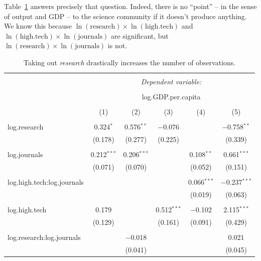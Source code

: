\documentclass[11pt]{article}
\begin{document}
Table~\ref{science_model_regressions} answers precisely that question. Indeed, there is no ``point'' -- in the sense of output and GDP -- to the science community if it doesn't produce anything. We know this because
$\ln(\mathrm{research}) \times \ln(\mathrm{high.tech})$ and
$\ln(\mathrm{high.tech}) \times \ln(\mathrm{journals})$
are significant, but 
$\ln(\mathrm{research}) \times \ln(\mathrm{journals})$ is not.

\begin{landscape}
\small
\begin{table}[!htbp] \centering 
  \caption{Taking out \emph{research} drastically increases the number of observations.}
  \label{science_model_regressions} 
\begin{tabular}{@{\extracolsep{5pt}}lccccc} 
\\[-1.8ex]\hline 
\hline \\[-1.8ex] 
 & \multicolumn{5}{c}{\textit{Dependent variable:}} \\ 
\cline{2-6} 
\\[-1.8ex] & \multicolumn{5}{c}{log.GDP.per.capita} \\ 
\\[-1.8ex] & (1) & (2) & (3) & (4) & (5)\\ 
\hline \\[-1.8ex] 
 log.research & 0.324$^{*}$ & 0.576$^{**}$ & $-$0.076 &  & $-$0.758$^{**}$ \\ 
  & (0.178) & (0.277) & (0.225) &  & (0.339) \\ 
  & & & & & \\ 
 log.journals & 0.212$^{***}$ & 0.206$^{***}$ &  & 0.108$^{**}$ & 0.661$^{***}$ \\ 
  & (0.071) & (0.070) &  & (0.052) & (0.151) \\ 
  & & & & & \\ 
 log.high.tech:log.journals &  &  &  & 0.066$^{***}$ & $-$0.237$^{***}$ \\ 
  &  &  &  & (0.019) & (0.063) \\ 
  & & & & & \\ 
 log.high.tech & 0.179 &  & 0.512$^{***}$ & $-$0.102 & 2.115$^{***}$ \\ 
  & (0.129) &  & (0.161) & (0.091) & (0.429) \\ 
  & & & & & \\ 
 log.research:log.journals &  & $-$0.018 &  &  & 0.021 \\ 
  &  & (0.041) &  &  & (0.045) \\ 

\end{tabular}
\end{table}
\end{landscape}
\end{document}
